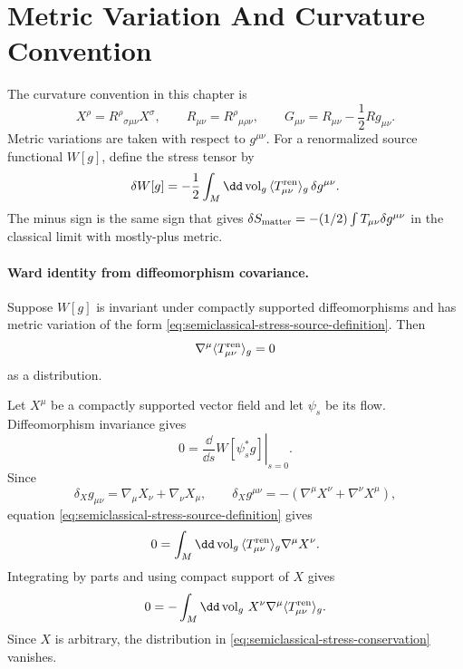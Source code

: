 \section{Metric Variation And Curvature Convention}

The curvature convention in this chapter is
\begin{equation}
  [\nabla_\mu,\nabla_\nu]X^\rho
  =
  R^\rho{}_{\sigma\mu\nu}X^\sigma,
  \qquad
  R_{\mu\nu}=R^\rho{}_{\mu\rho\nu},
  \qquad
  G_{\mu\nu}=R_{\mu\nu}-\frac12Rg_{\mu\nu}.
  \label{eq:semiclassical-curvature-convention}
\end{equation}
Metric variations are taken with respect to \(g^{\mu\nu}\).  For a
renormalized source functional \(W[g]\), define the stress tensor by
\begin{equation}
  \delta W[g]
  =
  -\frac12
  \int_M \dd\operatorname{vol}_g\,
  \langle T_{\mu\nu}^{\rm ren}\rangle_g\,\delta g^{\mu\nu}.
  \label{eq:semiclassical-stress-source-definition}
\end{equation}
The minus sign is the same sign that gives
\(\delta S_{\rm matter}=-(1/2)\int T_{\mu\nu}\delta g^{\mu\nu}\) in the
classical limit with mostly-plus metric.

\paragraph{Ward identity from diffeomorphism covariance.}
Suppose \(W[g]\) is invariant under compactly supported diffeomorphisms and
has metric variation of the form
\eqref{eq:semiclassical-stress-source-definition}.  Then
\begin{equation}
  \nabla^\mu\langle T_{\mu\nu}^{\rm ren}\rangle_g=0
  \label{eq:semiclassical-stress-conservation}
\end{equation}
as a distribution.

Let \(X^\mu\) be a compactly supported vector field and let
\(\psi_s\) be its flow.  Diffeomorphism invariance gives
\[
  0
  =
  \left.\frac{\dd}{\dd s}W[\psi_s^*g]\right|_{s=0}.
\]
Since
\[
  \delta_X g_{\mu\nu}=\nabla_\mu X_\nu+\nabla_\nu X_\mu,
  \qquad
  \delta_X g^{\mu\nu}=-(\nabla^\mu X^\nu+\nabla^\nu X^\mu),
\]
equation \eqref{eq:semiclassical-stress-source-definition} gives
\[
  0
  =
  \int_M \dd\operatorname{vol}_g\,
  \langle T_{\mu\nu}^{\rm ren}\rangle_g\nabla^\mu X^\nu .
\]
Integrating by parts and using compact support of \(X\) gives
\[
  0
  =
  -\int_M \dd\operatorname{vol}_g\,
  X^\nu\nabla^\mu\langle T_{\mu\nu}^{\rm ren}\rangle_g .
\]
Since \(X\) is arbitrary, the distribution in
\eqref{eq:semiclassical-stress-conservation} vanishes.

